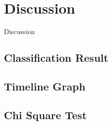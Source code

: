 \chapter{Discussion}
Discussion
\section{Classification Result}
\section{Timeline Graph} \label{sec:discussion}

\section{Chi Square Test}

